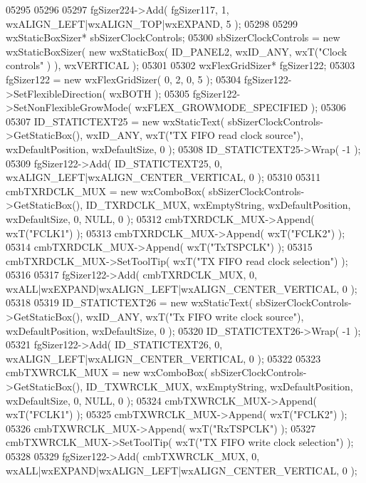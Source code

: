\begin{DoxyCode}
05295     
05296     
05297     fgSizer224->Add( fgSizer117, 1, wxALIGN\_LEFT|wxALIGN\_TOP|wxEXPAND, 5 );
05298     
05299     wxStaticBoxSizer* sbSizerClockControls;
05300     sbSizerClockControls = \textcolor{keyword}{new} wxStaticBoxSizer( \textcolor{keyword}{new} wxStaticBox( ID_PANEL2, wxID\_ANY, wxT(\textcolor{stringliteral}{"Clock controls"}
      ) ), wxVERTICAL );
05301     
05302     wxFlexGridSizer* fgSizer122;
05303     fgSizer122 = \textcolor{keyword}{new} wxFlexGridSizer( 0, 2, 0, 5 );
05304     fgSizer122->SetFlexibleDirection( wxBOTH );
05305     fgSizer122->SetNonFlexibleGrowMode( wxFLEX\_GROWMODE\_SPECIFIED );
05306     
05307     ID_STATICTEXT25 = \textcolor{keyword}{new} wxStaticText( sbSizerClockControls->GetStaticBox(), wxID\_ANY, wxT(\textcolor{stringliteral}{"TX FIFO read
       clock source"}), wxDefaultPosition, wxDefaultSize, 0 );
05308     ID_STATICTEXT25->Wrap( -1 );
05309     fgSizer122->Add( ID_STATICTEXT25, 0, wxALIGN\_LEFT|wxALIGN\_CENTER\_VERTICAL, 0 );
05310     
05311     cmbTXRDCLK_MUX = \textcolor{keyword}{new} wxComboBox( sbSizerClockControls->GetStaticBox(), 
      ID_TXRDCLK_MUX, wxEmptyString, wxDefaultPosition, wxDefaultSize, 0, NULL, 0 );
05312     cmbTXRDCLK_MUX->Append( wxT(\textcolor{stringliteral}{"FCLK1"}) );
05313     cmbTXRDCLK_MUX->Append( wxT(\textcolor{stringliteral}{"FCLK2"}) );
05314     cmbTXRDCLK_MUX->Append( wxT(\textcolor{stringliteral}{"TxTSPCLK"}) );
05315     cmbTXRDCLK_MUX->SetToolTip( wxT(\textcolor{stringliteral}{"TX FIFO read clock selection"}) );
05316     
05317     fgSizer122->Add( cmbTXRDCLK_MUX, 0, wxALL|wxEXPAND|wxALIGN\_LEFT|wxALIGN\_CENTER\_VERTICAL, 0 );
05318     
05319     ID_STATICTEXT26 = \textcolor{keyword}{new} wxStaticText( sbSizerClockControls->GetStaticBox(), wxID\_ANY, wxT(\textcolor{stringliteral}{"Tx FIFO write
       clock source"}), wxDefaultPosition, wxDefaultSize, 0 );
05320     ID_STATICTEXT26->Wrap( -1 );
05321     fgSizer122->Add( ID_STATICTEXT26, 0, wxALIGN\_LEFT|wxALIGN\_CENTER\_VERTICAL, 0 );
05322     
05323     cmbTXWRCLK_MUX = \textcolor{keyword}{new} wxComboBox( sbSizerClockControls->GetStaticBox(), 
      ID_TXWRCLK_MUX, wxEmptyString, wxDefaultPosition, wxDefaultSize, 0, NULL, 0 );
05324     cmbTXWRCLK_MUX->Append( wxT(\textcolor{stringliteral}{"FCLK1"}) );
05325     cmbTXWRCLK_MUX->Append( wxT(\textcolor{stringliteral}{"FCLK2"}) );
05326     cmbTXWRCLK_MUX->Append( wxT(\textcolor{stringliteral}{"RxTSPCLK"}) );
05327     cmbTXWRCLK_MUX->SetToolTip( wxT(\textcolor{stringliteral}{"TX FIFO write clock selection"}) );
05328     
05329     fgSizer122->Add( cmbTXWRCLK_MUX, 0, wxALL|wxEXPAND|wxALIGN\_LEFT|wxALIGN\_CENTER\_VERTICAL, 0 );

\end{DoxyCode}
